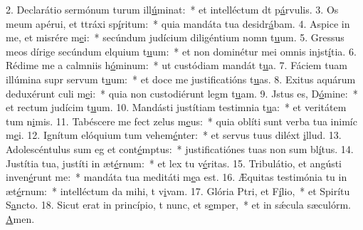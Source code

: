 2. Declarátio sermónum turum ill\uline{ú}minat:~* et intelléctum dt p\uline{á}rvulis.
3. Os meum apérui, et ttráxi sp\uline{í}ritum:~* quia mandáta tua desidr\uline{á}bam.
4. Aspice in me, et misrére m\uline{e}i:~* secúndum judícium diligéntium nomn t\uline{u}um.
5. Gressus meos dírige secúndum elquium t\uline{u}um:~* et non dominétur mei omnis injst\uline{í}tia.
6. Rédime me a calmniis h\uline{ó}minum:~* ut custódiam mandát t\uline{u}a.
7. Fáciem tuam illúmina supr servum t\uline{u}um:~* et doce me justificatións t\uline{u}as.
8. Exitus aquárum deduxérunt culi m\uline{e}i:~* quia non custodiérunt legm t\uline{u}am.
9. Jstus es, D\uline{ó}mine:~* et rectum judícim t\uline{u}um.
10. Mandásti justítiam testimnia t\uline{u}a:~* et veritátem tum n\uline{i}mis.
11. Tabéscere me fect zelus m\uline{e}us:~* quia oblíti sunt verba tua inimíc m\uline{e}i.
12. Ignítum elóquium tum vehem\uline{é}nter:~* et servus tuus diléxt \uline{i}llud.
13. Adolescéntulus sum eg et cont\uline{é}mptus:~* justificatiónes tuas non sum bl\uline{í}tus.
14. Justítia tua, justíti in æt\uline{é}rnum:~* et lex tu v\uline{é}ritas.
15. Tribulátio, et angústi inven\uline{é}runt me:~* mandáta tua meditáti m\uline{e}a est.
16. Æquitas testimónia tu in æt\uline{é}rnum:~* intelléctum da mihi, t v\uline{i}vam.
17. Glória Ptri, et F\uline{í}lio,~* et Spirítu S\uline{a}ncto.
18. Sicut erat in princípio, t nunc, et s\uline{e}mper,~* et in sǽcula sæculórm. \uline{A}men.
